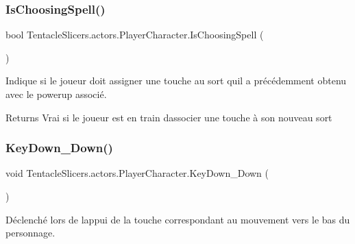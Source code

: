 \mbox{\label{class_tentacle_slicers_1_1actors_1_1_player_character_a6d99c2fc9ae39b200026d6e2dc706878}} 
\subsubsection{\texorpdfstring{Is\+Choosing\+Spell()}{IsChoosingSpell()}}
{\footnotesize\ttfamily bool Tentacle\+Slicers.\+actors.\+Player\+Character.\+Is\+Choosing\+Spell (\begin{DoxyParamCaption}{ }\end{DoxyParamCaption})}



Indique si le joueur doit assigner une touche au sort qu\textquotesingle{}il a précédemment obtenu avec le powerup associé. 

\begin{DoxyReturn}{Returns}
Vrai si le joueur est en train d\textquotesingle{}associer une touche à son nouveau sort 
\end{DoxyReturn}
\mbox{\label{class_tentacle_slicers_1_1actors_1_1_player_character_a88a4c15c5bafbdca5b80544f278c4966}} 
\subsubsection{\texorpdfstring{Key\+Down\+\_\+\+Down()}{KeyDown\_Down()}}
{\footnotesize\ttfamily void Tentacle\+Slicers.\+actors.\+Player\+Character.\+Key\+Down\+\_\+\+Down (\begin{DoxyParamCaption}{ }\end{DoxyParamCaption})}



Déclenché lors de l\textquotesingle{}appui de la touche correspondant au mouvement vers le bas du personnage. 

